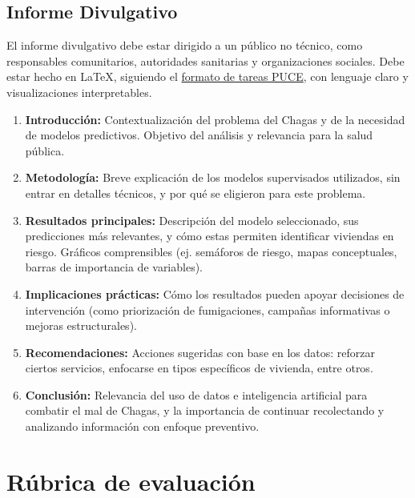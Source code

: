 \documentclass[a4,11pt]{aleph-notas}
\begin{document}
\subsection{Informe Divulgativo}
El informe divulgativo debe estar dirigido a un público no técnico, como responsables comunitarios, autoridades sanitarias y organizaciones sociales. Debe estar hecho en \LaTeX{}, siguiendo el \href{https://www.overleaf.com/latex/templates/formato-tareas-puce/nkgwqjtcrvms}{formato de tareas PUCE}, con lenguaje claro y visualizaciones interpretables.

\begin{enumerate}[leftmargin=*, label={\textbf{\arabic*.}}]
    \item \textbf{Introducción:} Contextualización del problema del Chagas y de la necesidad de modelos predictivos. Objetivo del análisis y relevancia para la salud pública.

    \item \textbf{Metodología:} Breve explicación de los modelos supervisados utilizados, sin entrar en detalles técnicos, y por qué se eligieron para este problema.

    \item \textbf{Resultados principales:} Descripción del modelo seleccionado, sus predicciones más relevantes, y cómo estas permiten identificar viviendas en riesgo. Gráficos comprensibles (ej. semáforos de riesgo, mapas conceptuales, barras de importancia de variables).

    \item \textbf{Implicaciones prácticas:} Cómo los resultados pueden apoyar decisiones de intervención (como priorización de fumigaciones, campañas informativas o mejoras estructurales).

    \item \textbf{Recomendaciones:} Acciones sugeridas con base en los datos: reforzar ciertos servicios, enfocarse en tipos específicos de vivienda, entre otros.

    \item \textbf{Conclusión:} Relevancia del uso de datos e inteligencia artificial para combatir el mal de Chagas, y la importancia de continuar recolectando y analizando información con enfoque preventivo.
\end{enumerate}

\section{Rúbrica de evaluación}
\end{document}
